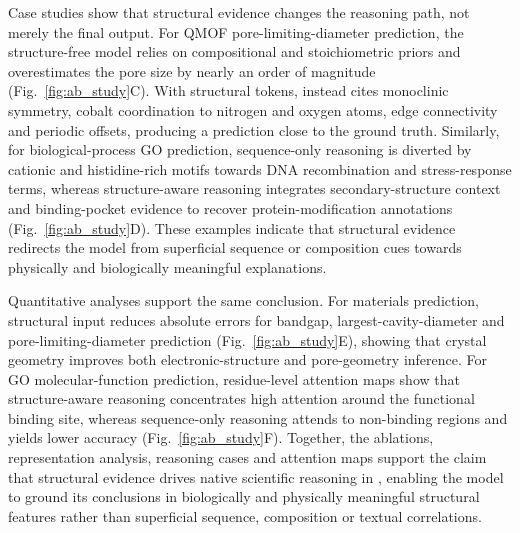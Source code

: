 Case studies show that structural evidence changes the reasoning path, not merely the final output.
For QMOF pore-limiting-diameter prediction, the structure-free model relies on compositional and stoichiometric priors and overestimates the pore size by nearly an order of magnitude (Fig.~\ref{fig:ab_study}C).
With structural tokens, \projName{} instead cites monoclinic symmetry, cobalt coordination to nitrogen and oxygen atoms, edge connectivity and periodic offsets, producing a prediction close to the ground truth.
Similarly, for biological-process GO prediction, sequence-only reasoning is diverted by cationic and histidine-rich motifs towards DNA recombination and stress-response terms, whereas structure-aware reasoning integrates secondary-structure context and binding-pocket evidence to recover protein-modification annotations (Fig.~\ref{fig:ab_study}D).
These examples indicate that structural evidence redirects the model from superficial sequence or composition cues towards physically and biologically meaningful explanations.

Quantitative analyses support the same conclusion.
For materials prediction, structural input reduces absolute errors for bandgap, largest-cavity-diameter and pore-limiting-diameter prediction (Fig.~\ref{fig:ab_study}E), showing that crystal geometry improves both electronic-structure and pore-geometry inference.
For GO molecular-function prediction, residue-level attention maps show that structure-aware reasoning concentrates high attention around the functional binding site, whereas sequence-only reasoning attends to non-binding regions and yields lower accuracy (Fig.~\ref{fig:ab_study}F).
Together, the ablations, representation analysis, reasoning cases and attention maps support the claim that structural evidence drives native scientific reasoning in \projName{}, enabling the model to ground its conclusions in biologically and physically meaningful structural features rather than superficial sequence, composition or textual correlations.


